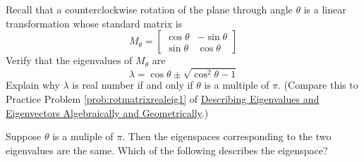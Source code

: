 \documentclass{ximera}
\begin{document}
\begin{problem}\label{prob:rotmatrixrealeig2}
Recall that a counterclockwise rotation of the plane through angle $\theta$ is a linear transformation whose standard matrix is $$M_{\theta}=\begin{bmatrix}\cos\theta&-\sin\theta\\\sin\theta&\cos\theta\end{bmatrix}$$
Verify that the eigenvalues of $M_{\theta}$ are
$$\lambda=\cos\theta\pm\sqrt{\cos^2\theta-1}$$
Explain why $\lambda$ is real number if and only if $\theta$ is a multiple of $\pi$.  (Compare this to Practice Problem \ref{prob:rotmatrixrealeig1} of \href{https://ximera.osu.edu/oerlinalg/LinearAlgebra/EIG-0010/main}{Describing Eigenvalues and Eigenvectors Algebraically and Geometrically}.)
    
Suppose $\theta$ is a muliple of $\pi$.  Then the eigenspaces corresponding to the two eigenvalues are the same.  Which of the following describes the eigenspace?
\begin{multipleChoice}
\end{multipleChoice}
    
\end{problem}
    
\end{document}
